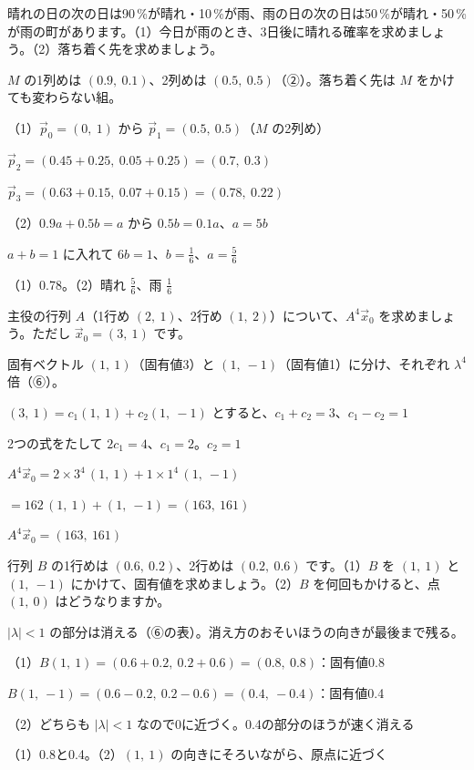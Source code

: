 \begin{reidai}[天気の行列]
晴れの日の次の日は90\,\%が晴れ・10\,\%が雨、雨の日の次の日は50\,\%が晴れ・50\,\%が雨の町があります。（1）今日が雨のとき、3日後に晴れる確率を求めましょう。（2）落ち着く先を求めましょう。\par
\kangaekata $M$ の1列めは $(0.9,\ 0.1)$、2列めは $(0.5,\ 0.5)$（②）。落ち着く先は $M$ をかけても変わらない組。\par
\shiki（1）$\vec p_0=(0,\ 1)$ から $\vec p_1=(0.5,\ 0.5)$（$M$ の2列め）\par
\kviikq $\vec p_2=(0.45+0.25,\ 0.05+0.25)=(0.7,\ 0.3)$\par
\kviikq $\vec p_3=(0.63+0.15,\ 0.07+0.15)=(0.78,\ 0.22)$\par
\kviikq（2）$0.9a+0.5b=a$ から $0.5b=0.1a$、$a=5b$\par
\kviikq $a+b=1$ に入れて $6b=1$、$b=\frac{1}{6}$、$a=\frac{5}{6}$\par
\kotae（1）0.78。（2）晴れ $\frac{5}{6}$、雨 $\frac{1}{6}$
\end{reidai}

\begin{reidai}
主役の行列 $A$（1行め $(2,\ 1)$、2行め $(1,\ 2)$）について、$A^4\vec x_0$ を求めましょう。ただし $\vec x_0=(3,\ 1)$ です。\par
\kangaekata 固有ベクトル $(1,\ 1)$（固有値3）と $(1,\ -1)$（固有値1）に分け、それぞれ $\lambda^4$ 倍（⑥）。\par
\shiki $(3,\ 1)=c_1(1,\ 1)+c_2(1,\ -1)$ とすると、$c_1+c_2=3$、$c_1-c_2=1$\par
\kviikq 2つの式をたして $2c_1=4$、$c_1=2$。$c_2=1$\par
\kviikq $A^4\vec x_0=2\times3^4\,(1,\ 1)+1\times1^4\,(1,\ -1)$\par
\kviikq $=162\,(1,\ 1)+(1,\ -1)=(163,\ 161)$\par
\kotae $A^4\vec x_0=(163,\ 161)$
\end{reidai}

\begin{reidai}[固有値で行き先を見分ける]
行列 $B$ の1行めは $(0.6,\ 0.2)$、2行めは $(0.2,\ 0.6)$ です。（1）$B$ を $(1,\ 1)$ と $(1,\ -1)$ にかけて、固有値を求めましょう。（2）$B$ を何回もかけると、点 $(1,\ 0)$ はどうなりますか。\par
\kangaekata $|\lambda|<1$ の部分は消える（⑥の表）。消え方のおそいほうの向きが最後まで残る。\par
\shiki（1）$B(1,\ 1)=(0.6+0.2,\ 0.2+0.6)=(0.8,\ 0.8)$：固有値0.8\par
\kviikq $B(1,\ -1)=(0.6-0.2,\ 0.2-0.6)=(0.4,\ -0.4)$：固有値0.4\par
\kviikq（2）どちらも $|\lambda|<1$ なので0に近づく。0.4の部分のほうが速く消える\par
\kotae（1）0.8と0.4。（2）$(1,\ 1)$ の向きにそろいながら、原点に近づく
\end{reidai}

